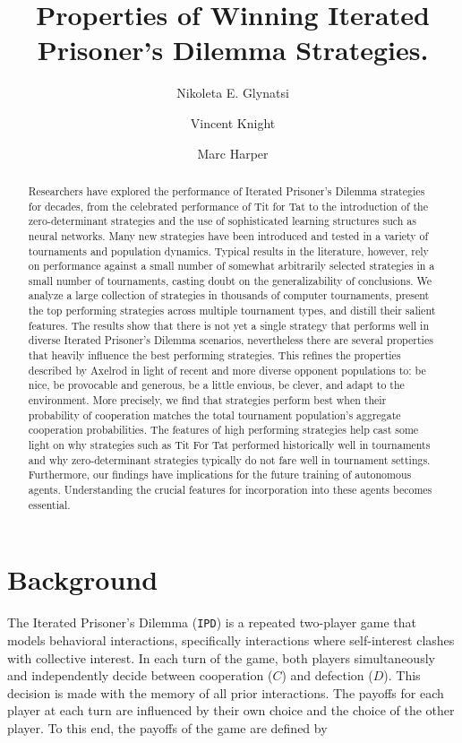 \documentclass{article}
\title{Properties of Winning Iterated Prisoner's Dilemma Strategies.}
\author[1]{Nikoleta E. Glynatsi}
\author[2]{Vincent Knight}
\author[3]{Marc Harper}
\affil[1]{Max Planck Institute for Evolutionary Biology, Research Group Dynamics of Social
Behavior, Germany}
\affil[2]{Cardiff University, School of Mathematics, UK}
\affil[3]{Google Inc., Mountain View, CA, USA}
\date{}
\newcommand{\numberofstrategies}{}
\def\IPD{\texttt{IPD}}
\begin{document}
\maketitle

\begin{abstract}
Researchers have explored the performance of Iterated Prisoner's Dilemma strategies
for decades, from the celebrated performance of Tit for Tat to the
introduction of the zero-determinant strategies and the use of sophisticated learning
structures such as neural networks. Many new strategies have been introduced and tested
in a variety of tournaments and population dynamics. Typical results in the literature,
however, rely on performance against a small number of somewhat arbitrarily selected
strategies in a small number of tournaments, casting doubt on the generalizability
of conclusions. We analyze a large collection of \numberofstrategies
strategies in thousands of computer tournaments, present the top performing strategies across multiple
tournament types, and distill their salient features.
The results show that there is not yet a single
strategy that performs well in diverse Iterated Prisoner's Dilemma scenarios,
nevertheless there are several properties that heavily influence the best performing
strategies. This refines the properties described by Axelrod in light of
recent and more diverse opponent populations to: be nice, be provocable and generous,
be a little envious, be clever, and adapt to the environment. More precisely,
we find that strategies perform best when their probability of cooperation
matches the total tournament population's aggregate cooperation probabilities.
The features of high performing strategies help cast some light on why
strategies such as Tit For Tat performed historically well in tournaments and
why zero-determinant strategies typically do not fare well in tournament
settings. Furthermore, our findings have implications for the future training of
autonomous agents. Understanding the crucial features for incorporation into
these agents becomes essential.
\end{abstract}

\section{Background}

The Iterated Prisoner's Dilemma (\IPD) is a repeated two-player game that models
behavioral interactions, specifically interactions where self-interest clashes
with collective interest. In each turn of the game, both players simultaneously
and independently decide between cooperation (\(C\)) and defection (\(D\)). This
decision is made with the memory of all prior interactions. The payoffs for each
player at each turn are influenced by their own choice and the choice of the
other player. To this end, the payoffs of the game are defined by
\end{document}
